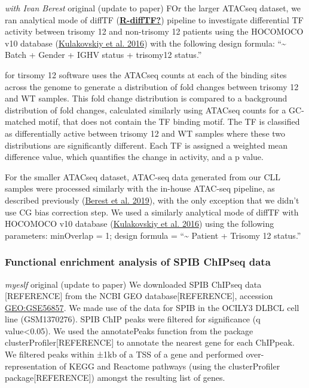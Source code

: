 \documentclass[11pt, a4paper, twosided]{book}
\begin{document}
\emph{with Ivan Berest} original (update to paper)
FOr the larger ATACseq dataset, we ran analytical mode of diffTF (\protect\hyperlink{ref-R-diffTF}{\textbf{R-diffTF?}}) pipeline to investigate differential TF activity between trisomy 12 and non-trisomy 12 patients using the HOCOMOCO v10 database (\protect\hyperlink{ref-HOCOMOCO}{Kulakovskiy et al. 2016}) with the following design formula: ``\textasciitilde{} Batch + Gender + IGHV status + trisomy12 status.''

for tirsomy 12 software uses the ATACseq counts at each of the binding sites across the genome to generate a distribution of fold changes between trisomy 12 and WT samples. This fold change distribution is compared to a background distribution of fold changes, calculated similarly using ATACseq counts for a GC-matched motif, that does not contain the TF binding motif. The TF is classified as differentially active between trisomy 12 and WT samples where these two distributions are significantly different. Each TF is assigned a weighted mean difference value, which quantifies the change in activity, and a p value.

For the smaller ATACseq dataset, ATAC-seq data generated from our CLL samples were processed similarly with the in-house ATAC-seq pipeline, as described previously (\protect\hyperlink{ref-Berest2019}{Berest et al. 2019}), with the only exception that we didn't use CG bias correction step. We used a similarly analytical mode of diffTF with HOCOMOCO v10 database (\protect\hyperlink{ref-HOCOMOCO}{Kulakovskiy et al. 2016}) using the following parameters: minOverlap = 1; design formula = ``\textasciitilde{} Patient + Trisomy 12 status.''

\hypertarget{functional-enrichment-analysis-of-spib-chipseq-data}{%
\subsubsection{Functional enrichment analysis of SPIB ChIPseq data}\label{functional-enrichment-analysis-of-spib-chipseq-data}}

\emph{myeslf} original (update to paper)
We downloaded SPIB ChIPseq data {[}REFERENCE{]} from the NCBI GEO database{[}REFERENCE{]}, accession \url{GEO:GSE56857}. We made use of the data for SPIB in the OCILY3 DLBCL cell line (GSM1370276). SPIB ChIP peaks were filtered for significance (q value\textless0.05). We used the annotatePeaks function from the package clusterProfiler{[}REFERENCE{]} to annotate the nearest gene for each ChIPpeak. We filtered peaks within ±1kb of a TSS of a gene and performed over-representation of KEGG and Reactome pathways (using the clusterProfiler package{[}REFERENCE{]}) amongst the resulting list of genes.
\end{document}
